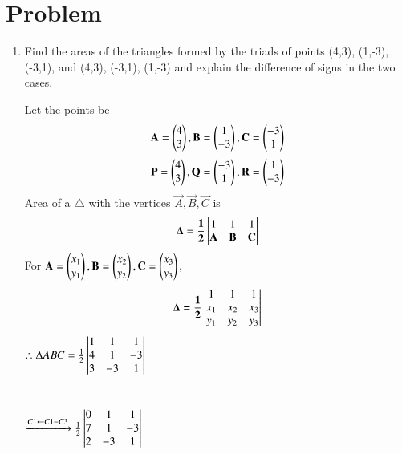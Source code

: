 \documentclass[journal,12pt,twocolumn]{IEEEtran}
\renewcommand\thesection{\arabic{section}}
\begin{document}
\renewcommand{\thefigure}{\theenumi}
\renewcommand{\thetable}{\theenumi}

\section{Problem}
\renewcommand{\theequation}{\theenumi}
\begin{enumerate}[label=\thesection.\arabic*.,ref=\thesection.\theenumi]

\item Find the areas of the triangles formed by the triads of points (4,3), (1,-3), (-3,1), and (4,3), (-3,1), (1,-3) and explain the difference of signs in the two cases.

\solution
Let the points be-
\begin{align}
\mathbf{A} = \begin{pmatrix}4\\3\end{pmatrix}, \mathbf{B} =\begin{pmatrix}1\\-3\end{pmatrix}, \mathbf{C} =\begin{pmatrix}-3\\1\end{pmatrix}
\end{align}
\begin{align}
\mathbf{P} =\begin{pmatrix}4\\3\end{pmatrix}, \mathbf{Q} =\begin{pmatrix}-3\\1\end{pmatrix}, \mathbf{R} =\begin{pmatrix}1\\-3\end{pmatrix}   
\end{align}
Area of a $\triangle$ with the vertices
$\vec{A}, \vec{B}, \vec{C}$ is
\begin{align}
\label{eq:area_tri_1}
\mathbf{\Delta = \frac{1}{2}}
\begin{vmatrix}1 & 1 & 1\\ \mathbf{A} & \mathbf{B} & \mathbf{C} \end{vmatrix}
\end{align}
For $\mathbf{A} = \begin{pmatrix}x_{1}\\y_{1}\end{pmatrix}, \mathbf{B} =\begin{pmatrix}x_{2}\\y_{2}\end{pmatrix}, \mathbf{C} =\begin{pmatrix}x_{3}\\y_{3}\end{pmatrix}$,
\begin{align}
\label{eq:area_tri_2}
\mathbf{\Delta = \frac{1}{2}\begin{vmatrix}1 & 1 & 1\\ x_{1}& x_{2} & x_{3}\\ y_{1} & y_{2} & y_{3}\end{vmatrix}}
\end{align}
$\therefore\Delta ABC=\frac{1}{2}\begin{vmatrix}1 & 1 & 1\\ 4 & 1 & -3\\ 3 & -3& 1\end{vmatrix}$
\\\\\\
$\xrightarrow[]{C1\leftarrow C1-C3}\frac{1}{2}\begin{vmatrix}0 & 1 & 1\\ 7 & 1 & -3\\ 2 & -3 & 1\end{vmatrix}$

\end{enumerate}
\end{document}
